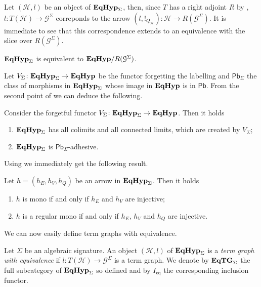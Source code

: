 \documentclass[a4paper,UKenglish,cleveref,pdftex,thm-restate,numberwithinsect]{lipics-v2021}
\newcommand{\pbc}{\mathsf{Pb}}
\newcommand{\eq}{\mathsf{eq}}
\newcommand{\catname}[1]{\textbf{\textup{#1}}}
\newcommand{\EqHyp}{\catname{EqHyp}} %
\newcommand{\EqTG}{\catname{EqTG}}
\begin{document}
Let $(\mathcal{H}, l)$ be an object of $\EqHyp_\Sigma$, then, since $T$ has a right adjoint $R$ by , $l\colon T(\mathcal{H})\to \mathcal{G}^\Sigma$ correponds to the arrow $(l, !_{Q_{\mathcal{H}}})\colon \mathcal{H}\to R(\mathcal{G}^\Sigma)$. It is immediate to see that this correspondence extends to an equivalence with the slice over $R(\mathcal{G}^\Sigma)$.

\begin{proposition}\label{prop:slice}
$\EqHyp_\Sigma$ is equivalent to $\EqHyp/R(\mathcal{G}^\Sigma)$.
\end{proposition}

Let $V_\Sigma\colon \EqHyp_\Sigma\to \EqHyp$ be the functor forgetting the labelling and $\pbc_\Sigma$ the class of morphisms in $\EqHyp_\Sigma$ whose image in $\EqHyp$ is in $\pbc$. From the second point of  we can deduce the following.

\begin{proposition}\label{prop:lim}Consider the forgetful functor $V_{\Sigma}\colon \EqHyp_\Sigma\to \EqHyp$. Then it holds
	\begin{enumerate}
		\item $\EqHyp_\Sigma$ has all colimits and all connected limits, which are created by $V_{\Sigma}$;
		\item $\EqHyp_\Sigma$ is $\pbc_\Sigma$-adhesive.
	\end{enumerate}
\end{proposition}

Using  we immediately get the following result. 

\begin{corollary}\label{prop:monos_in_eqhyps} Let $h=(h_{E}, h_V, h_Q)$ be an arrow in $\EqHyp_\Sigma$. Then it holds
	\begin{enumerate}
		\item $h$ is mono if and only if $h_E$ and $h_V$ are injective;
		\item $h$ is a regular mono if and only if $h_E$, $h_V$ and $h_Q$ are injective.
	\end{enumerate}
\end{corollary}


We can now easily define term graphs with equivalence.

\begin{definition}Let $\Sigma$ be an algebraic signature.
	An object $(\mathcal{H}, l)$ of $\EqHyp_\Sigma$ is a \emph{term graph with equivalence} if $l\colon T(\mathcal{H})\to \mathcal{G}^\Sigma$ is a term graph. We denote by $\EqTG_{\Sigma}$ the full subcategory of $\EqHyp_\Sigma$ so defined and by $I_{\eq}$ the corresponding inclusion functor.
 \end{definition}
\end{document}

